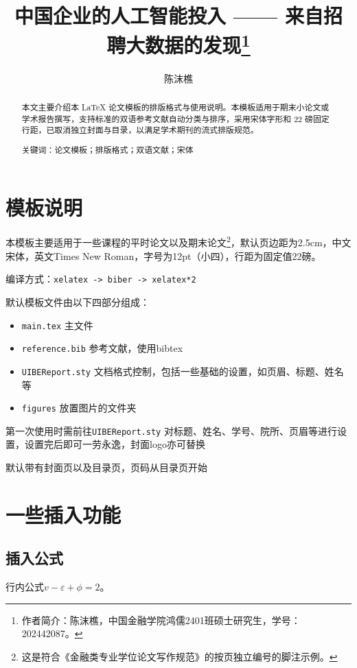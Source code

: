 \documentclass[12pt,hyperref,a4paper,UTF8]{ctexart}
\begin{document}
\title{\songti\bfseries{} 中国企业的人工智能投入 —— 来自招聘大数据的发现\thanks{作者简介：陈沫樵，中国金融学院鸿儒2401班硕士研究生，学号：202442087。}}
\author{\kaishu{} 陈沫樵}
\date{}

\maketitle

\begin{abstract}
本文主要介绍本 LaTeX 论文模板的排版格式与使用说明。本模板适用于期末小论文或学术报告撰写，支持标准的双语参考文献自动分类与排序，采用宋体字形和 22 磅固定行距，已取消独立封面与目录，以满足学术期刊的流式排版规范。

{\heiti 关键词：}论文模板；排版格式；双语文献；宋体
\end{abstract}

\section{模板说明}
本模板主要适用于一些课程的平时论文以及期末论文\footnote{这是符合《金融类专业学位论文写作规范》的按页独立编号的脚注示例。}，默认页边距为2.5cm，中文宋体，英文Times New Roman，字号为12pt（小四），行距为固定值22磅。

编译方式：\verb|xelatex -> biber -> xelatex*2|


默认模板文件由以下四部分组成：
\begin{itemize}
    \item \texttt{main.tex} 主文件
    \item \texttt{reference.bib} 参考文献，使用bibtex
    \item \texttt{UIBEReport.sty} 文档格式控制，包括一些基础的设置，如页眉、标题、姓名等
    \item \texttt{figures} 放置图片的文件夹
\end{itemize}

第一次使用时需前往\texttt{UIBEReport.sty} 对标题、姓名、学号、院所、页眉等进行设置，设置完后即可一劳永逸，封面logo亦可替换

默认带有封面页以及目录页，页码从目录页开始

\section{一些插入功能}
\subsection{插入公式}
行内公式$v-\varepsilon+\phi=2$。
\end{document}
